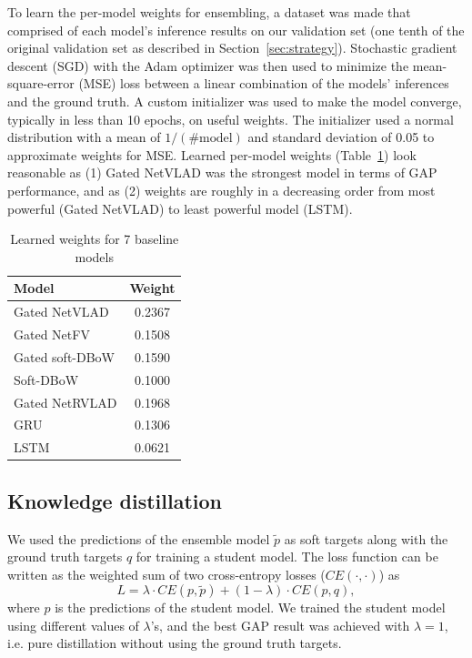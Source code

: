 \documentclass[runningheads]{llncs}
\begin{document}
To learn the per-model weights for ensembling, a dataset was made that comprised of each model's inference results on our validation set (one tenth of the original validation set as described in Section~\ref{sec:strategy}).
Stochastic gradient descent (SGD) with the Adam optimizer was then used to minimize the mean-square-error (MSE) loss between a linear combination of the models' inferences and the ground truth.
A custom initializer was used to make the model converge, typically in less than 10 epochs, on useful weights.
The initializer used a normal distribution with a mean of $1/(\# \textrm{model})$ and standard deviation of 0.05 to approximate weights for MSE.
Learned per-model weights (Table~\ref{tab:learned_weights}) look reasonable as (1) Gated NetVLAD was the strongest model in terms of GAP performance, and as (2) weights are roughly in a decreasing order from most powerful (Gated NetVLAD) to least powerful model (LSTM).

\begin{table}[h!]
  \begin{center}
    \caption{Learned weights for 7 baseline models}
    \label{tab:learned_weights}

    \begin{tabular}{ l | c }
     Model & Weight \\
    \hline
    \hline
            Gated NetVLAD & 0.2367 \\
    \hline
            Gated NetFV & 0.1508 \\
    \hline
            Gated soft-DBoW & 0.1590 \\
    \hline
            Soft-DBoW & 0.1000 \\
    \hline
            Gated NetRVLAD & 0.1968\\
    \hline
            GRU & 0.1306 \\
    \hline
            LSTM & 0.0621
    \end{tabular}
  \end{center}
\end{table}

\subsection{Knowledge distillation} \label{sub:distillation}
We used the predictions of the ensemble model $\tilde{p}$ as soft targets along with the ground truth targets $q$ for training a student model.
The loss function can be written as the weighted sum of two cross-entropy losses ($CE(\cdot,\cdot)$) as
\begin{equation}
L = \lambda \cdot CE(p, \tilde{p}) + (1-\lambda) \cdot CE(p,  q),
\end{equation}
where $p$ is the predictions of the student model.
We trained the student model using different values of $\lambda$’s, and the best GAP result was achieved with $\lambda = 1$, i.e. pure distillation without using the ground truth targets.
\end{document}

